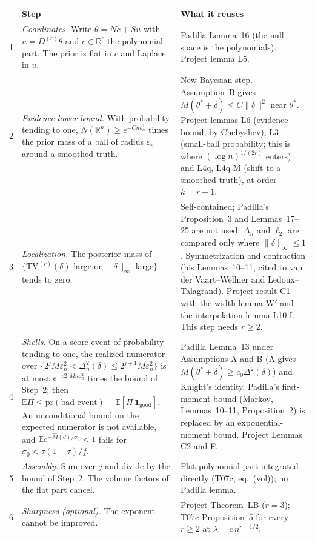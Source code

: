\documentclass[11pt]{article}
\theoremstyle{definition}
\theoremstyle{remark}
\newcommand{\R}{\mathbb{R}}
\newcommand{\E}{\mathbb{E}}
\newcommand{\pr}{\mathrm{pr}}
\newcommand{\TV}{\mathrm{TV}}
\newcommand{\Dr}{D^{(r)}}
\newcommand{\thetas}{\theta^{*}}
\begin{document}
\begin{center}
\renewcommand{\arraystretch}{1.25}
\begin{tabular}{p{}p{}p{}}
\toprule
 & Step & What it reuses\\
\midrule
1 & \emph{Coordinates.} Write $\theta=Nc+Su$ with $u=\Dr\theta$ and $c\in\R^r$ the polynomial part. The prior is flat in $c$ and Laplace in $u$. & Padilla Lemma~16 (the null space is the polynomials). Project lemma L5.\\
2 & \emph{Evidence lower bound.} With probability tending to one, $N(\R^n)\ge e^{-Cn\varepsilon_n^2}$ times the prior mass of a ball of radius $\varepsilon_n$ around a smoothed truth. & New Bayesian step. Assumption~B gives $M(\thetas+\delta)\le C\|\delta\|^2$ near $\thetas$. Project lemmas L6 (evidence bound, by Chebyshev), L3 (small-ball probability; this is where $(\log n)^{1/(2r)}$ enters) and L4q, L4q-M (shift to a smoothed truth), at order $k=r-1$.\\
3 & \emph{Localization.} The posterior mass of $\{\TV^{(r)}(\delta)$ large or $\|\delta\|_\infty$ large$\}$ tends to zero. & Self-contained; Padilla's Proposition~3 and Lemmas~17--25 are not used. $\Delta_n$ and $\ell_2$ are compared only where $\|\delta\|_\infty\le1$. Symmetrization and contraction (his Lemmas~10--11, cited to van der Vaart--Wellner and Ledoux--Talagrand). Project result C1 with the width lemma W$'$ and the interpolation lemma L10-I. This step needs $r\ge 2$.\\
4 & \emph{Shells.} On a score event of probability tending to one, the realized numerator over $\{2^jM\varepsilon_n^2<\Delta_n^2(\delta)\le 2^{j+1}M\varepsilon_n^2\}$ is at most $e^{-c2^jMn\varepsilon_n^2}$ times the bound of Step~2; then $\E\Pi\le\pr(\text{bad event})+\E[\Pi\,\mathbf 1_{\text{good}}]$. An unconditional bound on the expected numerator is not available, and $\E e^{-\hat M(\theta)/\sigma_0}<1$ fails for $\sigma_0<\tau(1-\tau)/\underline f$. & Padilla Lemma~13 under Assumptions A and B (A gives $M(\thetas+\delta)\ge c_0\Delta^2(\delta)$) and Knight's identity. Padilla's first-moment bound (Markov, Lemmas~10--11, Proposition~2) is replaced by an exponential-moment bound. Project Lemmas C2 and F.\\
5 & \emph{Assembly.} Sum over $j$ and divide by the bound of Step~2. The volume factors of the flat part cancel. & Flat polynomial part integrated directly (T07c, eq.~(vol)); no Padilla lemma.\\
6 & \emph{Sharpness (optional).} The exponent cannot be improved. & Project Theorem~LB ($r=3$); T07c Proposition~5 for every $r\ge2$ at $\lambda=c\,n^{r-1/2}$.\\
\bottomrule
\end{tabular}
\end{center}
\end{document}
